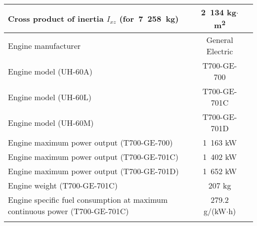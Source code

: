 \begin{tabularx}{\textwidth}{ | L | c | c | }
  Cross product of inertia $I_{xz}$ (for~7~258~kg) & 2~134 kg$\cdot$m\textsuperscript{2} & \cite{NASA-CR-166309} \\ \hline
  Engine manufacturer                   & General Electric & \cite{Janes20042005} \\ \hline
  Engine model (UH-60A)                 & T700-GE-700      & \cite{Janes20042005,UH60_OperatorsManual} \\ \hline
  Engine model (UH-60L)                 & T700-GE-701C     & \cite{Janes20042005,UH60_OperatorsManual} \\ \hline
  Engine model (UH-60M)                 & T700-GE-701D     & \cite{Janes20042005} \\ \hline
  Engine maximum power output (T700-GE-700)  & 1~163 kW    & \cite{Janes20042005} \\ \hline
  Engine maximum power output (T700-GE-701C) & 1~402 kW    & \cite{Janes20042005} \\ \hline
  Engine maximum power output (T700-GE-701D) & 1~652 kW    & \cite{Janes20042005} \\ \hline
  Engine weight (T700-GE-701C)          & 207 kg           & \cite{UH60_GE_T700_DataSheet} \\ \hline
  Engine specific fuel consumption at maximum continuous power (T700-GE-701C) & 279.2 g/(kW$\cdot$h) & \cite{UH60_GE_T700_DataSheet} \\ \hline
  \caption{Basic data}
\end{tabularx}
